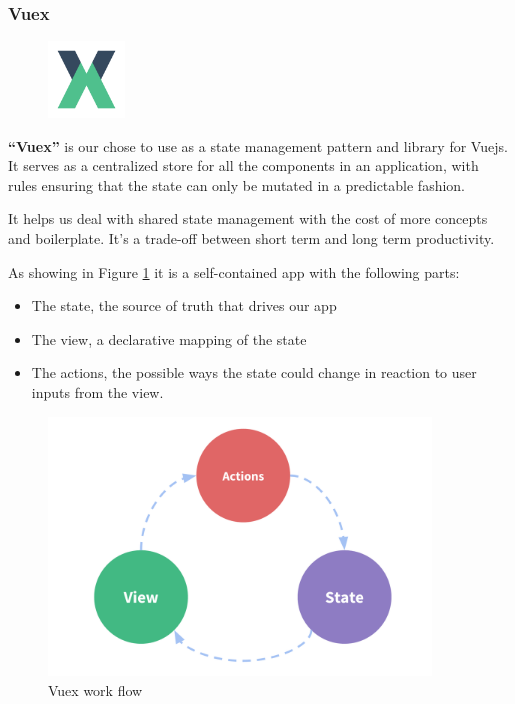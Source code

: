 \documentclass[12pt,a4paper]{report}
\begin{document}
	\subsubsection*{Vuex}
	\begin{figure}
		\centering
		\includegraphics[width=0.8in]{vuex-logo.png}	
		
	\end{figure}
	\textbf{``Vuex''} is our chose to use as a state management pattern and library for Vuejs. It serves as a centralized store for all the components in an application, with rules ensuring that the state can only be mutated in a predictable fashion.\par 
	It helps us deal with shared state management with the cost of more concepts and boilerplate. It's a trade-off between short term and long term productivity.\par
	As showing in Figure \ref{label-vuex} it is a self-contained app with the following parts:
	\begin{itemize}
		\item The state, the source of truth that drives our app
		\item The view, a declarative mapping of the state
		\item The actions, the possible ways the state could change in reaction to user inputs from the view.
		
	\end{itemize}
	\begin{figure}[H]
		\centering
		\includegraphics[width=4in,keepaspectratio]{flow-vuex.png}
		\caption{Vuex work flow}
		\label{label-vuex}
	\end{figure}
	\clearpage
\end{document}
